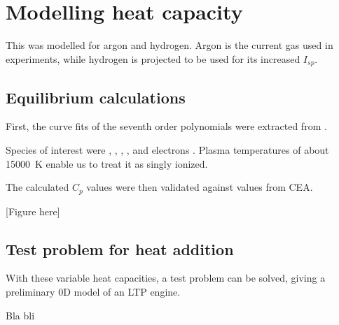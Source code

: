 \chapter{Modelling heat capacity} \label{chp:models}
    
    This was modelled for argon and hydrogen. Argon is the current gas used in experiments, while hydrogen is projected to be used for its increased $I_{sp}$.

    \section{Equilibrium calculations} \label{sec:equilibrium calcs}
        
        First, the curve fits of the seventh order polynomials were extracted from \textcite{mcbrideNASAGlennCoefficients2002}.

        Species of interest were , , , ,  and electrons . Plasma temperatures of about \qty{15000}{K} enable us to treat it as singly ionized.


        The calculated $C_p$ values were then validated against values from CEA.
        
        [Figure here] 

    \section{Test problem for heat addition}

        With these variable heat capacities, a test problem can be solved, giving a preliminary 0D model of an LTP engine.

        Bla bli